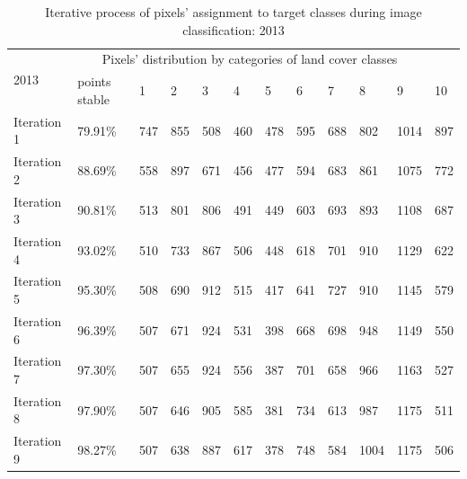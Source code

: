 \documentclass[jmse,article,submit,pdftex,moreauthors]{Definitions/mdpi}
\begin{document}
\begin{table}[H]
  \centering
  \begin{tabularx}{\textwidth}{p{1.6cm}p{1.8cm}p{0.6cm}p{0.6cm}p{0.6cm}p{0.6cm}p{0.6cm}p{0.6cm}p{0.6cm}p{0.6cm}p{0.6cm}p{0.6cm}}
  \toprule
  \multirow{2}{*}{2013} & \multicolumn{10}{c}{Pixels' distribution by categories of land cover classes} \\
     & points stable  & 1 & 2 &  3 & 4 & 5 & 6 & 7 & 8 & 9 & 10 \\
    \midrule
    Iteration 1 & 79.91\% & 747 & 855 & 508 & 460 & 478 & 595 & 688 & 802 & 1014 & 897 \\
    Iteration 2 & 88.69\% & 558 & 897 & 671 & 456 & 477& 594 &683 & 861& 1075 &772 \\
    Iteration 3 & 90.81\% & 513 & 801 & 806 & 491 & 449 & 603 & 693 & 893 & 1108 & 687 \\
    Iteration 4 & 93.02\% & 510  & 733 & 867 & 506 & 448 & 618 & 701 & 910 & 1129 & 622 \\
    Iteration 5 & 95.30\% & 508 & 690 & 912 & 515 & 417 & 641  & 727& 910 &1145 &579\\
    Iteration 6 & 96.39\% & 507 & 671 & 924 &531 &398 & 668 & 698 & 948 &1149  &550 \\
    Iteration 7 & 97.30\% &  507 & 655 & 924 & 556 & 387& 701& 658 & 966 &1163 & 527\\
    Iteration 8 & 97.90\% &  507 & 646 & 905 &585 &381 & 734 & 613 &987 & 1175 &511 \\
    Iteration 9 & 98.27\% & 507 & 638  & 887 &617 & 378 &748 & 584 &1004 &1175  &506\\
\bottomrule
\end{tabularx}
  \caption{Iterative process of pixels' assignment to target classes during image classification: 2013}
  \label{tabB1}
\end{table}
\end{document}
